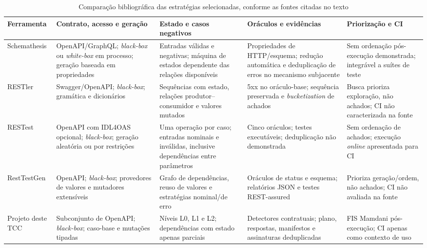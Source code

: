 \begin{table}[H]
\centering
\footnotesize
\setlength{\tabcolsep}{4pt}
\renewcommand{\arraystretch}{1.08}
\caption{Comparação bibliográfica das estratégias selecionadas, conforme as
fontes citadas no texto}
\label{tab:ferramentas-relacionadas}
\begin{tabular}{|>{\raggedright\arraybackslash}p{2.0cm}|
>{\raggedright\arraybackslash}p{3.1cm}|
>{\raggedright\arraybackslash}p{2.9cm}|
>{\raggedright\arraybackslash}p{3.3cm}|
>{\raggedright\arraybackslash}p{3.2cm}|}
\hline
\textbf{Ferramenta} & \textbf{Contrato, acesso e geração} &
\textbf{Estado e casos negativos} & \textbf{Oráculos e evidências} &
\textbf{Priorização e CI} \\ \hline
Schemathesis &
OpenAPI/GraphQL; \textit{black-box} ou \textit{white-box} em processo; geração baseada em propriedades &
Entradas válidas e negativas; máquina de estados dependente das relações disponíveis &
Propriedades de HTTP/esquema; redução automática e deduplicação de erros no mecanismo subjacente &
Sem ordenação pós-execução demonstrada; integrável a suítes de teste \\ \hline
RESTler &
Swagger/OpenAPI; \textit{black-box}; gramática e dicionários &
Sequências com estado, relações produtor--consumidor e valores mutados &
5xx no oráculo-base; sequência preservada e \textit{bucketization} de achados &
Busca prioriza exploração, não achados; CI não caracterizada na fonte \\ \hline
RESTest &
OpenAPI com IDL4OAS opcional; \textit{black-box}; geração aleatória ou por restrições &
Uma operação por caso; entradas nominais e inválidas, inclusive dependências entre parâmetros &
Cinco oráculos; testes executáveis; deduplicação não demonstrada &
Sem ordenação de achados; execução \textit{online} apresentada para CI \\ \hline
RestTestGen &
OpenAPI; \textit{black-box}; provedores de valores e mutadores extensíveis &
Grafo de dependências, reuso de valores e estratégias nominal/de erro &
Oráculos de status e esquema; relatórios JSON e testes REST-assured &
Prioriza geração/ordem, não achados; CI não avaliada na fonte \\ \hline
Projeto deste TCC &
Subconjunto de OpenAPI; \textit{black-box}; caso-base e mutações tipadas &
Níveis L0, L1 e L2; dependências com estado apenas parciais &
Detectores contratuais; plano, respostas, manifestos e assinaturas deduplicadas &
FIS Mamdani pós-execução; CI apenas como contexto de uso \\ \hline
\end{tabular}
\end{table}

